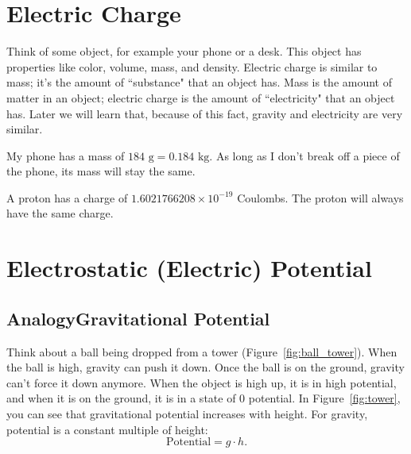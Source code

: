 \documentclass[12pt,paper=letter]{scrartcl}
\begin{document}
    \section{Electric Charge}\label{sec:electric-charge}
    Think of some object, for example your phone or a desk.
    This object has properties like color, volume, mass, and density.
    \pnp
    Electric charge is similar to mass;
    it's the amount of ``substance" that an object has.
    Mass is the amount of matter in an object;
    electric charge is the amount of ``electricity" that an object has.
    \pnp
    Later we will learn that, because of this fact, gravity and electricity are very similar.

    \begin{exboxed}[Mass]
        My phone has a mass of $184\text{ g}=0.184\text{ kg}$.
        As long as I don't break off a piece of the phone, its mass will stay the same.
    \end{exboxed}


    \begin{exboxed}
        A proton has a charge of $1.6021766208 \times 10^{-19}$ Coulombs.
        The proton will always have the same charge.
    \end{exboxed}


    \section{Electrostatic (Electric) Potential}\label{sec:electrostaticpotential}

    \subsection{Analogy\textemdash Gravitational Potential}\label{subsec:gravitational-potential}

    Think about a ball being dropped from a tower (Figure~\ref{fig:ball_tower}).
    When the ball is high, gravity can push it down.
    Once the ball is on the ground, gravity can't force it down anymore.
    When the object is high up, it is in high potential, and when it is on the ground, it is in a state of 0 potential.
    In Figure~\ref{fig:tower}, you can see that gravitational potential increases with height.
    For gravity, potential is a constant multiple of height:
    \[\text{Potential}=g\cdot h.\]

    

    
\end{document}
